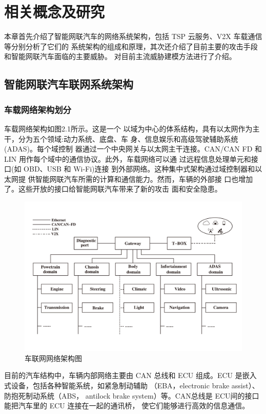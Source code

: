 \chapter{相关概念及研究}
\label{ch2}

本章首先介绍了智能网联汽车的网络系统架构，包括 TSP 云服务、V2X 车载通信等分别分析了它们的
系统架构的组成和原理，其次还介绍了目前主要的攻击手段和智能网联汽车面临的主要威胁。
对目前主流威胁建模方法进行了介绍。

\section{智能网联汽车联网系统架构}

\subsection{车载网络架构划分}
车载网络架构如图2.1所示。这是一个
以域为中心的体系结构，具有以太网作为主干，分为五个领域:动力系统、底盘、车
身、信息娱乐和高级驾驶辅助系统(ADAS)。每个域控制
器通过一个中央网关与以太网主干连接。CAN/CAN FD 和
LIN 用作每个域中的通信协议。此外，车载网络可以通
过远程信息处理单元和接口(如 OBD、USB 和 Wi-Fi)连接
到外部网络。这种集中式架构通过域控制器和以太网提
供智能网联汽车所需的计算和通信能力。然而，车辆的外部接
口也增加了。这些开放的接口给智能网联汽车带来了新的攻击
面和安全隐患。
\begin{figure}
  \centering
  \includegraphics[scale=0.4]{resources/img/i1.jpg}
  \caption{车联网网络架构图}
\end{figure}
目前的汽车结构中，车辆内部网络主要由 CAN
总线和 ECU 组成。ECU 是嵌入式设备，包括各种智能系统，如紧急制动辅助
（EBA，electronic brake assist）、防抱死制动系统（ABS，
antilock brake system）等。CAN总线是 ECU间的接口
能把汽车里的 ECU 连接在一起的通讯桥，
使它们能够进行高效的信息通信。

